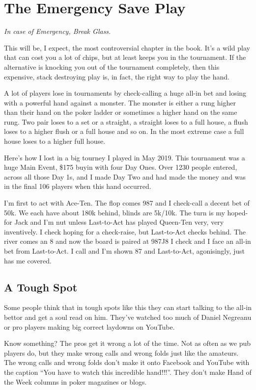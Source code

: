 \chapter{The Emergency Save Play}

\textit{In case of Emergency, Break Glass.}


This will be, I expect, the most controversial chapter in the
book. It's a wild play that can cost you a lot of chips, but at least
keeps you in the tournament. If the alternative is knocking you out of
the tournament completely, then this expensive, stack destroying play
is, in fact, the right way to play the hand.

A lot of players lose in tournaments by check-calling a huge all-in
bet and losing with a powerful hand against a monster. The monster is
either a rung higher than their hand on the poker ladder or sometimes
a higher hand on the same rung. Two pair loses to a set or a straight,
a straight loses to a full house, a flush loses to a higher flush or a
full house and so on. In the most extreme case a full house loses to a
higher full house.

Here's how I lost in a big tourney I played in May 2019. This
tournament was a huge Main Event, \$175 buyin with four Day Ones. Over
1230 people entered, across all those Day 1s, and I made Day Two and
had made the money and was in the final 106 players when this hand
occurred.

I'm first to act with Ace-Ten. The flop comes 987 and I check-call a
decent bet of 50k. We each have about 180k behind, blinds are 5k/10k.
The turn is my hoped-for Jack and I'm nut unless Last-to-Act has
played Queen-Ten very, very inventively. I check hoping for a
check-raise, but Last-to-Act checks behind. The river comes an 8 and
now the board is paired at 987J8 I check and I face an all-in bet from
Last-to-Act. I call and I'm shown 87 and Last-to-Act, agonisingly,
just has me covered.

\section{A Tough Spot}

Some people think that in tough spots like this they can start talking
to the all-in bettor and get a soul read on him. They've watched too
much of Daniel Negreanu or pro players making big correct laydowns on
YouTube.

Know something? The pros get it wrong a lot of the time. Not as
often as we pub players do, but they make wrong calls and wrong folds
just like the amateurs. The wrong calls and wrong folds don't make it
onto Facebook and YouTube with the caption ``You have to watch
this incredible hand!!!''. They don't make Hand of the Week columns in
poker magazines or blogs.


